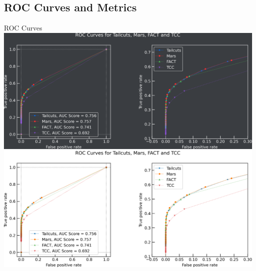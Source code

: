 \subsection{ROC Curves and Metrics}
\begin{frame}[label=roc]{ROC Curves}
  \ifdefined\darktheme
    \centering
    \includegraphics[width=\textwidth]{plots/roc_zoom_dark.png}
  \else
    \centering
    \includegraphics[width=\textwidth]{plots/roc_zoom_light.png}
  \fi
\end{frame}
